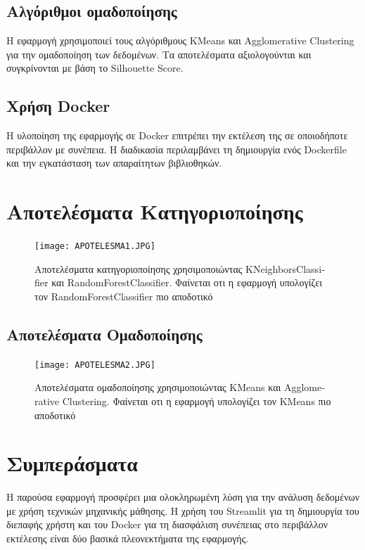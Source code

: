 \documentclass[a4paper,12pt]{article}
\begin{document}
\subsection{Αλγόριθμοι ομαδοποίησης}
Η εφαρμογή χρησιμοποιεί τους αλγόριθμους \textlatin{KMeans} και \textlatin{Agglomerative Clustering} για την ομαδοποίηση των δεδομένων. Τα αποτελέσματα αξιολογούνται και συγκρίνονται με βάση το \textlatin{Silhouette Score}.

\subsection{Χρήση \textlatin{Docker}}
Η υλοποίηση της εφαρμογής σε \textlatin{Docker} επιτρέπει την εκτέλεση της σε οποιοδήποτε περιβάλλον με συνέπεια. Η διαδικασία περιλαμβάνει τη δημιουργία ενός \textlatin{Dockerfile} και την εγκατάσταση των απαραίτητων βιβλιοθηκών.

\section{Αποτελέσματα Κατηγοριοποίησης}
\begin{figure}[h!]
\centering
\texttt{[image: APOTELESMA1.JPG]}
\caption{Αποτελέσματα κατηγοριοποίησης χρησιμοποιώντας \textlatin{KNeighborsClassifier} και \textlatin{RandomForestClassifier}. Φαίνεται οτι η εφαρμογή υπολογίζει τον \textlatin{RandomForestClassifier} πιο αποδοτικό }
\end{figure}

\subsection{Αποτελέσματα Ομαδοποίησης}
\begin{figure}[h!]
\centering
\texttt{[image: APOTELESMA2.JPG]}
\caption{Αποτελέσματα ομαδοποίησης χρησιμοποιώντας \textlatin{KMeans} και \textlatin{Agglomerative Clustering}. Φαίνεται οτι η εφαρμογή υπολογίζει τον \textlatin{KMeans} πιο αποδοτικό}
\end{figure}

\section{Συμπεράσματα}
\label{sec:conclusion}
Η παρούσα εφαρμογή προσφέρει μια ολοκληρωμένη λύση για την ανάλυση δεδομένων με χρήση τεχνικών μηχανικής μάθησης. Η χρήση του \textlatin{Streamlit} για τη δημιουργία του διεπαφής χρήστη και του \textlatin{Docker} για τη διασφάλιση συνέπειας στο περιβάλλον εκτέλεσης είναι δύο βασικά πλεονεκτήματα της εφαρμογής.
\end{document}
